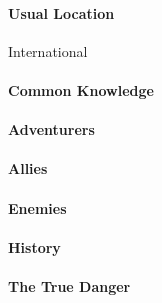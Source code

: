 \begin{multicols}{2}
    \paragraph{Usual Location} International
    \paragraph{Common Knowledge} 
    \paragraph{Adventurers}
    \paragraph{Allies}
    \paragraph{Enemies}
    \paragraph{History}
    \paragraph{The True Danger}   
\end{multicols}
